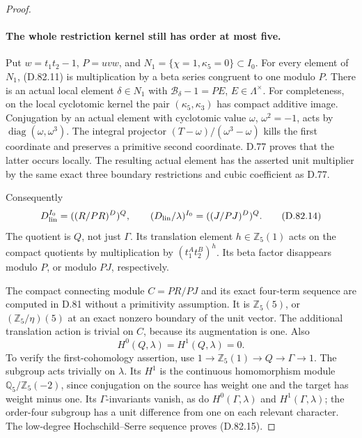 \begin{proof}
\paragraph{The whole restriction kernel still has order at most five.}
Put \(w=t_1t_2-1\), \(P=uvw\), and
\(N_1=\{\chi=1,\kappa_5=0\}\subset I_0\).
For every element of \(N_1\), (D.82.11) is multiplication
by a beta series congruent to one modulo \(P\).
There is an actual local element \(\delta\in N_1\) with
\(\mathcal B_\delta-1=P E\), \(E\in\Lambda^\times\).
For completeness, on the local cyclotomic kernel the pair
\((\kappa_5,\kappa_3)\) has compact additive image. Conjugation
by an actual element with cyclotomic value
\(\omega\), \(\omega^2=-1\), acts by
\(\operatorname{diag}(\omega,\omega^3)\).
The integral projector
\((T-\omega)/(\omega^3-\omega)\) kills the first coordinate
and preserves a primitive second coordinate. D.77 proves
that the latter occurs locally. The resulting actual element
has the asserted unit multiplier by the same exact three
boundary restrictions and cubic coefficient as D.77.

Consequently
\[
 D_{\rm lin}^{I_0}=((R/PR)^D)^Q,\qquad
 (D_{\rm lin}/\lambda)^{I_0}=((J/PJ)^D)^Q.
                                                               \tag{D.82.14}
\]
The quotient is \(Q\), not just \(\Gamma\).
Its translation element \(h\in\mathbb Z_5(1)\) acts on
the compact quotients by multiplication by
\((t_1^A t_2^B)^h\). Its beta factor disappears modulo
\(P\), or modulo \(PJ\), respectively.

The compact connecting module \(C=PR/PJ\) and its exact
four-term sequence are computed in D.81 without a
primitivity assumption. It is \(\mathbb Z_5(5)\), or
\((\mathbb Z_5/\eta)(5)\) at an exact nonzero boundary of the unit vector.
The additional translation action is trivial on \(C\),
because its augmentation is one.
Also
\[
                      H^0(Q,\lambda)=H^1(Q,\lambda)=0.
                                                               \tag{D.82.15}
\]
To verify the first-cohomology assertion, use
\(1\to\mathbb Z_5(1)\to Q\to\Gamma\to1\).
The subgroup acts trivially on \(\lambda\).
Its \(H^1\) is the continuous homomorphism module
\(\mathbb Q_5/\mathbb Z_5(-2)\), since conjugation on the
source has weight one and the target has weight minus one.
Its \(\Gamma\)-invariants vanish, as do
\(H^0(\Gamma,\lambda)\) and \(H^1(\Gamma,\lambda)\);
the order-four subgroup has a unit difference from one
on each relevant character. The low-degree
Hochschild--Serre sequence proves (D.82.15).


\end{proof}

